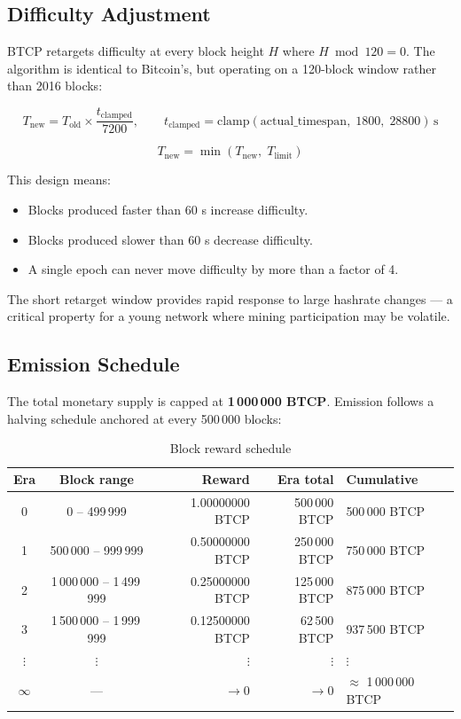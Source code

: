 \documentclass[12pt, a4paper]{article}
\begin{document}
\subsection{Difficulty Adjustment}

BTCP retargets difficulty at every block height $H$ where $H \bmod 120 = 0$.
The algorithm is identical to Bitcoin's, but operating on a 120-block window
rather than 2016 blocks:

\[
  T_{\text{new}} = T_{\text{old}}
    \times \frac{t_{\text{clamped}}}{7200},
  \qquad
  t_{\text{clamped}} = \mathrm{clamp}(\text{actual\_timespan},\;1800,\;28800)\,\text{s}
\]

\[
  T_{\text{new}} = \min\!\left(T_{\text{new}},\; T_{\text{limit}}\right)
\]

This design means:
\begin{itemize}[noitemsep]
  \item Blocks produced faster than 60 s increase difficulty.
  \item Blocks produced slower than 60 s decrease difficulty.
  \item A single epoch can never move difficulty by more than a factor of 4.
\end{itemize}

The short retarget window provides rapid response to large hashrate changes
— a critical property for a young network where mining participation may be
volatile.

\subsection{Emission Schedule}

The total monetary supply is capped at \textbf{1\,000\,000 BTCP}.  Emission
follows a halving schedule anchored at every 500\,000 blocks:

\begin{table}[h!]
\centering
\caption{Block reward schedule}
\begin{tabular}{@{}ccrrl@{}}
\toprule
\textbf{Era} & \textbf{Block range} & \textbf{Reward} & \textbf{Era total} & \textbf{Cumulative} \\
\midrule
0 & 0 – 499\,999       & 1.00000000 BTCP & 500\,000 BTCP  & 500\,000 BTCP \\
1 & 500\,000 – 999\,999    & 0.50000000 BTCP & 250\,000 BTCP  & 750\,000 BTCP \\
2 & 1\,000\,000 – 1\,499\,999 & 0.25000000 BTCP & 125\,000 BTCP  & 875\,000 BTCP \\
3 & 1\,500\,000 – 1\,999\,999 & 0.12500000 BTCP & 62\,500 BTCP   & 937\,500 BTCP \\
$\vdots$ & $\vdots$        & $\vdots$        & $\vdots$       & $\vdots$      \\
$\infty$ & —              & $\to 0$         & $\to 0$        & $\approx$ 1\,000\,000 BTCP \\
\bottomrule
\end{tabular}
\end{table}
\end{document}
